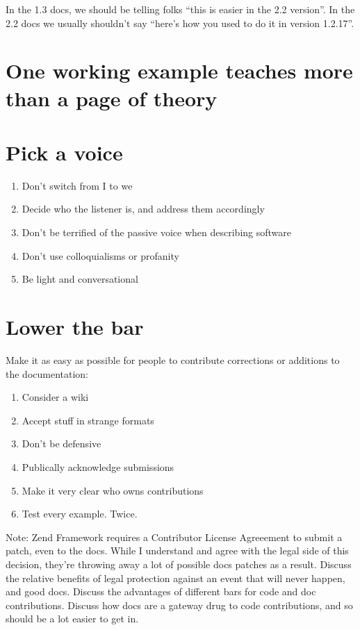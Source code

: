 In the 1.3 docs, we should be telling folks ``this is easier in the 2.2
version''. In the 2.2 docs we usually shouldn't say ``here's how you
used to do it in version 1.2.17''.

\section{One working example teaches more than a page of theory}

\section{Pick a voice}
\begin{enumerate}
\item Don't switch from I to we
\item Decide who the listener is, and address them accordingly
\item Don't be terrified of the passive voice when describing software
\item Don't use colloquialisms or profanity
\item Be light and conversational
\end{enumerate}

\section{Lower the bar}

Make it as easy as possible for people to contribute corrections or
additions to the documentation:
\begin{enumerate}
\item Consider a wiki
\item Accept stuff in strange formats
\item Don't be defensive
\item Publically acknowledge submissions
\item Make it very clear who owns contributions
\item Test every example. Twice.
\end{enumerate}

Note: Zend Framework requires a Contributor License Agreeement to submit
a patch, even to the docs. While I understand and agree with the legal
side of this decision, they're throwing away a lot of possible docs
patches as a result. Discuss the relative benefits of legal protection
against an event that will never happen, and good docs. Discuss the
advantages of different bars for code and doc contributions. Discuss how
docs are a gateway drug to code contributions, and so should be a lot
easier to get in.


